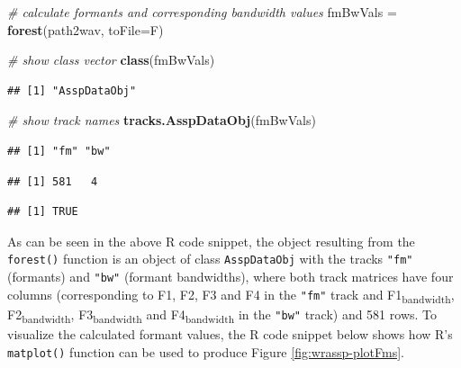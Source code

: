 \documentclass[]{book}
\newenvironment{Shaded}{\begin{snugshade}}{\end{snugshade}}
\newcommand{\CommentTok}[1]{\textcolor[rgb]{0.56,0.35,0.01}{\textit{#1}}}
\newcommand{\DataTypeTok}[1]{\textcolor[rgb]{0.13,0.29,0.53}{#1}}
\newcommand{\KeywordTok}[1]{\textcolor[rgb]{0.13,0.29,0.53}{\textbf{#1}}}
\newcommand{\NormalTok}[1]{#1}
\newcommand{\OperatorTok}[1]{\textcolor[rgb]{0.81,0.36,0.00}{\textbf{#1}}}
\newcommand{\StringTok}[1]{\textcolor[rgb]{0.31,0.60,0.02}{#1}}
\begin{document}
\begin{Shaded}
\begin{Highlighting}[]
\CommentTok{# calculate formants and corresponding bandwidth values}
\NormalTok{fmBwVals =}\StringTok{ }\KeywordTok{forest}\NormalTok{(path2wav, }\DataTypeTok{toFile=}\NormalTok{F)}

\CommentTok{# show class vector}
\KeywordTok{class}\NormalTok{(fmBwVals)}
\end{Highlighting}
\end{Shaded}

\begin{verbatim}
## [1] "AsspDataObj"
\end{verbatim}

\begin{Shaded}
\begin{Highlighting}[]
\CommentTok{# show track names}
\KeywordTok{tracks.AsspDataObj}\NormalTok{(fmBwVals)}
\end{Highlighting}
\end{Shaded}

\begin{verbatim}
## [1] "fm" "bw"
\end{verbatim}

\begin{Shaded}
\end{Shaded}

\begin{verbatim}
## [1] 581   4
\end{verbatim}

\begin{Shaded}
\end{Shaded}

\begin{verbatim}
## [1] TRUE
\end{verbatim}

As can be seen in the above R code snippet, the object resulting from the \texttt{forest()} function is an object of class \texttt{AsspDataObj} with the tracks \texttt{"fm"} (formants) and \texttt{"bw"} (formant bandwidths), where both track matrices have four columns (corresponding to F1, F2, F3 and F4 in the \texttt{"fm"} track and F1\textsubscript{bandwidth}, F2\textsubscript{bandwidth}, F3\textsubscript{bandwidth} and F4\textsubscript{bandwidth} in the \texttt{"bw"} track) and 581 rows. To visualize the calculated formant values, the R code snippet below shows how R's \texttt{matplot()} function can be used to produce Figure \ref{fig:wrassp-plotFms}.
\end{document}

